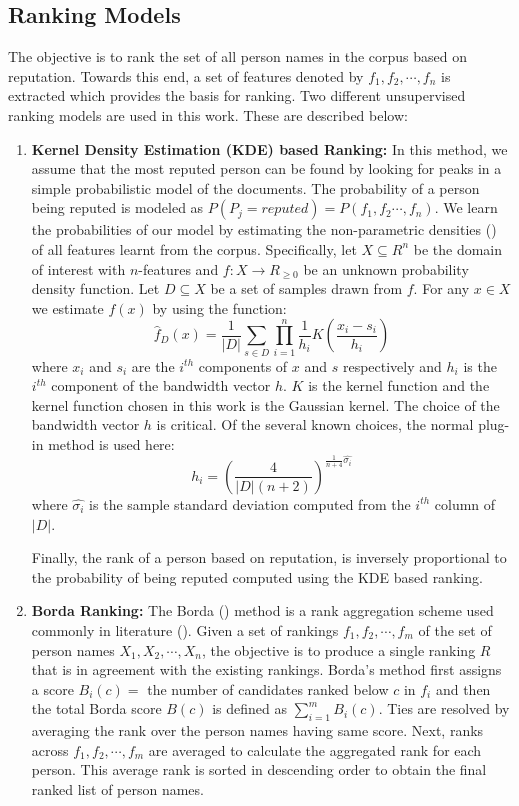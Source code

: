 \documentclass[a4paper,man,natbib]{apa6}
\begin{document}
\subsection{Ranking Models }
The objective is to rank the set of all person names in the corpus based on reputation. Towards this end, a set of features denoted by $f_1,f_2, \cdots, f_n$ is extracted which provides the basis for ranking. Two different unsupervised ranking models are used in this work. These are described below:
\begin{enumerate}
\item \textbf{Kernel Density Estimation (KDE) based Ranking: } In this method, we assume that the most reputed person can be found by looking for peaks in a simple probabilistic model of the documents. The probability of a person being reputed is modeled as $P(P_j = reputed) = P(f_1,f_2 \cdots, f_n)$. We learn the probabilities of our model by estimating the non-parametric densities (\cite{scott_multivariate_2015, Silverman86}) of all features learnt from the corpus. Specifically, let $X \subseteq R^n$ be the domain of interest with $n$-features and $f: X \rightarrow R_{\ge 0}$ be an unknown probability density function. Let $D \subseteq X$ be a set of samples drawn from $f$. For any $x \in X$ we estimate $f(x)$ by using the function:
\begin{equation}
\label{eqn1}
\hat{f}_D(x) = \frac{1}{|D|} \sum_{s \in D} \prod_{i=1}^{n} \frac{1}{h_i} K(\frac{x_i - s_i}{h_i})
\end{equation}
where $x_i$ and $s_i$ are the $i^{th}$ components of $x$ and $s$ respectively and $h_i$ is the $i^{th}$ component of the bandwidth vector $h$. $K$ is the kernel function and the kernel function chosen in this work is the Gaussian kernel. The choice of the bandwidth vector $h$ is critical. Of the several known choices, the normal plug-in method is used here:
\begin{equation}
\label{eqn2}
h_i = (\frac{4}{|D| (n+2)})^{\frac{1}{n+4} \hat{\sigma_i}}
\end{equation}
where $ \hat{\sigma_i}$ is the sample standard deviation computed from the $i^{th}$ column of $|D|$.

Finally, the rank of a person based on reputation, is inversely proportional to the probability of being reputed computed using the KDE based ranking.  

 \item \textbf{Borda Ranking: } The Borda (\cite{Borda_81}) method is a rank aggregation scheme used commonly in literature (\cite{Dwork_01}). Given a set of rankings $f_1, f_2, \cdots, f_m$ of the set of person names $X_1, X_2, \cdots, X_n$, the objective is to produce a single ranking $R$ that is in agreement with the existing rankings. Borda's method first assigns a score $B_i(c)=$ the number of candidates ranked below $c$ in $f_i$ and then the total Borda score $B(c)$ is defined as $\sum_{i=1}^{m} B_i(c)$. Ties are resolved by averaging the rank over the person names having same score. Next, ranks across $f_1, f_2, \cdots, f_m$ are averaged to calculate the aggregated rank for each person. This average rank is sorted in descending order to obtain the final ranked list of person names.
 

\end{enumerate}
\end{document}

